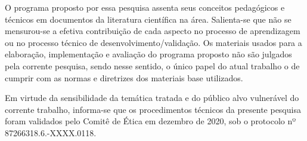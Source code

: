 


O programa proposto por essa pesquisa assenta seus conceitos pedagógicos e técnicos em documentos da literatura científica na área. Salienta-se que não se mensurou-se a efetiva contribuição de cada aspecto no processo de aprendizagem ou no processo técnico de desenvolvimento/validação. Os materiais usados para a elaboração, implementação e avaliação do programa proposto não são julgados pela corrente pesquisa, sendo nesse sentido, o único papel do atual trabalho o de cumprir com as normas e diretrizes dos materiais base utilizados. 

Em virtude da sensibilidade da temática tratada e do público alvo vulnerável do corrente trabalho, informa-se que os procedimentos técnicos da presente pesquisa foram validados pelo Comitê de Ética em dezembro de 2020, sob o protocolo nº 87266318.6.-XXXX.0118. %


\newpage

 
 
 





